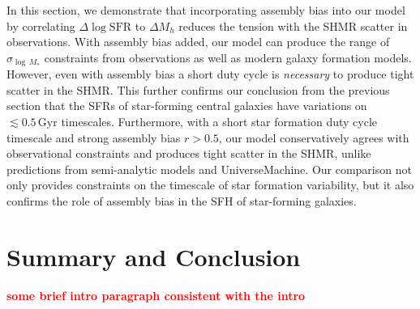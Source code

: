 \documentclass[12pt, letterpaper, preprint, tighten]{aastex62}
\newcommand{\todo}[1]{{\bf \textcolor{red}{#1}}}
\newcommand{\logsfr}{\log\mathrm{SFR}}
\begin{document}
In this section, we demonstrate that incorporating assembly bias into our model
by correlating $\Delta\logsfr$ to $\Delta M_h$ reduces the tension with the 
SHMR scatter in observations. With assembly bias added, our model can produce 
the range of $\sigma_{\log\,M_*}$ constraints from observations as well as 
modern galaxy formation models. However, even with assembly bias a short duty 
cycle is \emph{necessary} to produce tight scatter in the SHMR. This further 
confirms our conclusion from the previous section that the SFRs of star-forming 
central galaxies have variations on $\lesssim 0.5\,\mathrm{Gyr}$ timescales.
Furthermore, with a short star formation duty cycle timescale and strong 
assembly bias $r > 0.5$, our model conservatively agrees with observational 
constraints and produces tight scatter in the SHMR, unlike predictions from
semi-analytic models and {\sc UniverseMachine}. Our comparison not only provides 
constraints on the timescale of star formation variability, but it also confirms
the role of assembly bias in the SFH of star-forming galaxies.

\section{Summary and Conclusion} \label{sec:summary}
\todo{some brief intro paragraph consistent with the intro} 
\end{document}
